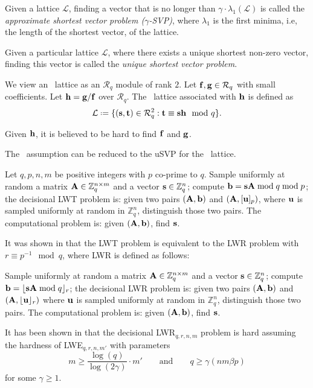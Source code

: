 \documentclass{llncs}
\newcommand{\Lcal}{{\mathcal L}}
\newcommand{\Rcal}{{\mathcal R}}
\newcommand{\ZZ}{\mathbb{Z}}
\newcommand{\bfb}{{\bf b}}
\newcommand{\bff}{{\bf f}}
\newcommand{\bfg}{{\bf g}}
\newcommand{\bfh}{{\bf h}}
\newcommand{\bfs}{{\bf s}}
\newcommand{\bft}{{\bf t}}
\newcommand{\bfu}{{\bf u}}
\newcommand{\bfA}{{\bf A}}
\newcommand{\ntru}{{\sf{NTRU}}}
\newcommand{\<}{\langle}
\renewcommand{\>}{\rangle}
\newcommand*{\defeq}{\mathrel{\vcenter{\baselineskip0.5ex \lineskiplimit0pt
                     \hbox{\scriptsize.}\hbox{\scriptsize.}}}%
                     =}
\begin{document}
\begin{definition}
Given a lattice $\Lcal$, finding a vector that is no longer than $\gamma\cdot \lambda_1(\Lcal)$ is called the {\em approximate shortest vector problem ($\gamma$-SVP)}, 
where $\lambda_1$ is the first minima, i.e, the length of the shortest vector, of the lattice.

 Given a particular lattice $\Lcal$, where
there exists a unique shortest non-zero vector, finding this vector is called the 
{\em unique shortest vector problem}.
\end{definition}

We view an \ntru~lattice as an $\Rcal_q$ module of rank $2$. 
Let $\bff, \bfg \in \Rcal_q$ with small coefficients.
Let $\bfh = \bfg/\bff$ over $\Rcal_q$.
The \ntru~lattice associated with $\bfh$ is defined as
\[\Lcal \defeq \{(\bfs,\bft)\in \Rcal_q^2: \bft  \equiv  \bfs \bfh \mod q\}.\]
\begin{definition}[\ntru~assumption]
Given $\bfh$, it is believed to be hard to 
find $\bff$ and $\bfg$.
\end{definition}
The \ntru~assumption can be reduced to the uSVP for the \ntru~lattice.
\begin{definition}[LWT$_{q,p,n,m}$]
Let $q,p,n, m$ be positive integers with $p$ co-prime to $q$.
Sample uniformly at random a matrix $\bfA\in \ZZ_q^{n\times m}$ and a vector $\bfs\in \ZZ^n_q$; compute $\bfb = \bfs\bfA \bmod q  \bmod p$; the decisional LWT problem is: given two pairs  $(\bfA,\bfb)$ and 
$(\bfA,[\bfu]_p)$, where $\bfu$ is sampled uniformly
at random in $\ZZ^n_q$, distinguish those two pairs.
The computational problem is: given 
$(\bfA,\bfb)$, find $\bfs$.
\end{definition}
It was shown in \cite{cryptoeprint:2017:995} that the LWT problem is 
equivalent to the LWR problem with $ r \equiv p^{-1} \mod q$, where 
LWR is defined as follows:
\begin{definition}[LWR$_{q,r,n,m}$] Sample uniformly at random a matrix $\bfA\in \ZZ_q^{n\times m}$ and a vector $\bfs\in \ZZ^n_q$; compute $\bfb = \lfloor\bfs\bfA \bmod q \rfloor_r$; the decisional LWR problem is: given two pairs  $(\bfA,\bfb)$ and 
$(\bfA,\lfloor\bfu\rfloor_r)$ where $\bfu$ is sampled uniformly
at random in $\ZZ^n_q$, distinguish those two pairs.
The computational problem is: given 
$(\bfA,\bfb)$, find $\bfs$.
\end{definition}

It has been shown in \cite{DBLP:conf/crypto/AlwenKPW13} that the decisional LWR$_{q,r,n,m}$ problem is hard assuming the hardness
of LWE$_{q,r,n,m'}$ with parameters
$$
m \geq \frac{\log(q)}{\log (2\gamma)} \cdot m'
\quad\quad
\text{and}\quad\quad
q \geq \gamma(nm\beta p)
$$
for some $\gamma\geq 1$. %
\end{document}
